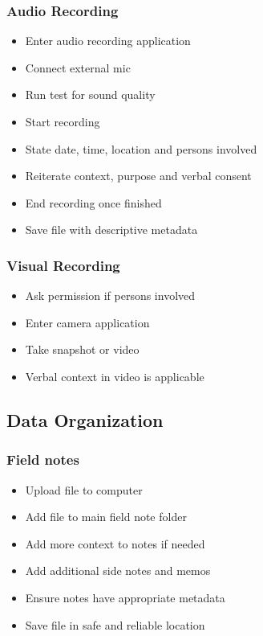\documentclass{article}
\begin{document}
\subsubsection{Audio Recording}
\begin{itemize}
\item Enter audio recording application
\item Connect external mic 
\item Run test for sound quality 
\item Start recording
\item State date, time, location and persons involved
\item Reiterate context, purpose and verbal consent
\item End recording once finished
\item Save file with descriptive metadata
\end{itemize}

 \subsubsection{Visual Recording}
\begin{itemize}
\item Ask permission if persons involved
\item Enter camera application
\item Take snapshot or video
\item Verbal context in video is applicable
\end{itemize}

\subsection{Data Organization}
\subsubsection{Field notes}
\begin{itemize}
\item Upload file to computer
\item Add file to main field note folder
\item Add more context to notes if needed
\item Add additional side notes and memos
\item Ensure notes have appropriate metadata
\item Save file in safe and reliable location
\end{itemize}
\end{document}
